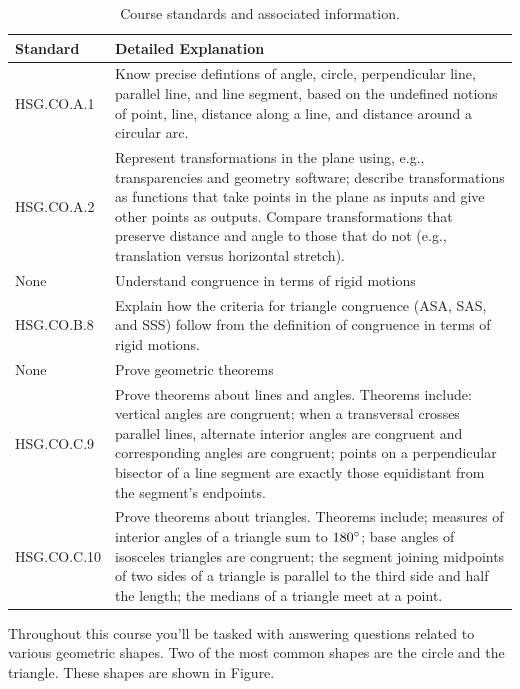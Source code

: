 \documentclass[12pt, oneside]{book}
\begin{document}
\begin{table}[h]
    \centering
    \caption{Course standards and associated information.}
    \vspace{0.3cm} %
    \begin{tabularx}{\textwidth}{l X} %
        \toprule
        \textbf{Standard} & \textbf{Detailed Explanation} \\
        \midrule
        HSG.CO.A.1 & Know precise defintions of angle, circle, perpendicular line, parallel line, and line segment, based on the undefined notions of point, line, distance along a line, and distance around a circular arc. \\
        HSG.CO.A.2 & Represent transformations in the plane using, e.g., transparencies and geometry software; describe transformations as functions that take points in the plane as inputs and give other points as outputs. Compare transformations that preserve distance and angle to those that do not (e.g., translation versus horizontal stretch). \\
        None & Understand congruence in terms of rigid motions \\
        HSG.CO.B.8 & Explain how the criteria for triangle congruence (ASA, SAS, and SSS) follow from the definition of congruence in terms of rigid motions. \\
        None & Prove geometric theorems \\
        HSG.CO.C.9 & Prove theorems about lines and angles. Theorems include: vertical angles are congruent; when a transversal crosses parallel lines, alternate interior angles are congruent and corresponding angles are congruent; points on a perpendicular bisector of a line segment are exactly those equidistant from the segment's endpoints. \\
        HSG.CO.C.10 & Prove theorems about triangles. Theorems include; measures of interior angles of a triangle sum to $180\degree$; base angles of isosceles triangles are congruent; the segment joining midpoints of two sides of a triangle is parallel to the third side and half the length; the medians of a triangle meet at a point. \\
        \bottomrule
    \end{tabularx}
\end{table}

Throughout this course you'll be tasked with answering questions related to various geometric shapes. Two of the most common shapes are the circle and the triangle. These shapes are shown in Figure.
\end{document}
